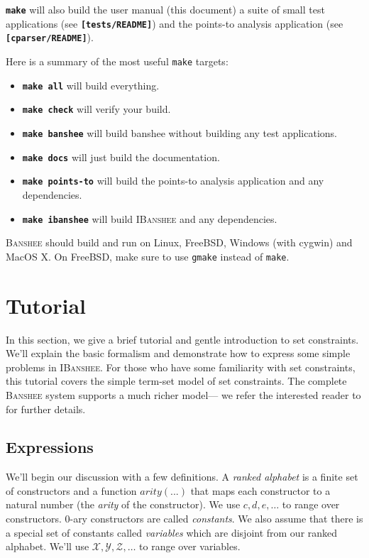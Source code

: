 \documentclass[10pt]{article}
\newcommand{\banshee}{\textsc{Banshee}}
\newcommand{\ibanshee}{\textsc{IBanshee}}
\newcommand{\file}[1]{\texttt{\textbf{[#1]}}}
\newcommand{\cmd}[1]{\texttt{\textbf{#1}}}
\newcommand{\var}[1]{\mathcal{#1}}
\begin{document}
\cmd{make} will also build the user manual (this document) a suite of
small test applications (see \file{tests/README}) and the points-to
analysis application (see \file{cparser/README}).

Here is a summary of the most useful \texttt{make} targets:

\begin{itemize}
\item \cmd{make all} will build everything.
\item \cmd{make check} will verify your build.
\item \cmd{make banshee} will build banshee without building any test
  applications.
\item \cmd{make docs} will just build the documentation.
\item \cmd{make points-to} will build the points-to analysis
  application and any dependencies.
\item \cmd{make ibanshee} will build \ibanshee{} and any dependencies.
\end{itemize}

\banshee{} should build and run on Linux, FreeBSD, Windows (with
cygwin) and MacOS X. On FreeBSD, make sure to use \texttt{gmake}
instead of \texttt{make}.

\section{Tutorial}
\label{sec-tutorial}

In this section, we give a brief tutorial and gentle introduction to
set constraints. We'll explain the basic formalism and demonstrate how
to express some simple problems in \ibanshee{}. For those who have
some familiarity with set constraints, this tutorial covers the simple
term-set model of set constraints. The complete \banshee{} system
supports a much richer model--- we refer the interested reader to
\cite{fahndrich:sas97,fahndrich:thesis} for further details.

\subsection{Expressions}

We'll begin our discussion with a few definitions. A \emph{ranked
  alphabet} is a finite set of constructors and a function
$arity(...)$ that maps each constructor to a natural number (the
\emph{arity} of the constructor). We use $c,d,e,\ldots$ to range over
constructors. $0$-ary constructors are called \emph{constants}. We
also assume that there is a special set of constants called
\emph{variables} which are disjoint from our ranked alphabet. We'll
use $\var{X}, \var{Y}, \var{Z}, \ldots$ to range over variables.
\end{document}
